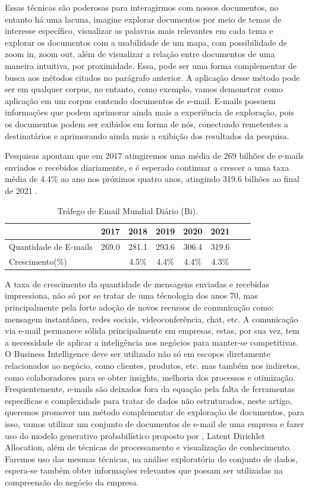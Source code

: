 \documentclass[12pt,a4paper]{article}
\begin{document}
  Essas técnicas são poderosas para interagirmos com nossos documentos, no entanto há uma lacuna, imagine explorar documentos por meio de temas de interesse específico, visualizar as palavras mais relevantes em cada tema e explorar os documentos com a usabilidade de um mapa, com possibilidade de zoom in, zoom out, além de visualizar a relação entre documentos de uma maneira intuitiva, por proximidade. Essa, pode ser uma forma complementar de busca aos métodos citados no parágrafo anterior. A aplicação desse método pode ser em qualquer corpus, no entanto, como exemplo, vamos demonstrar como aplicação em um corpus contendo documentos de e-mail.
  E-mails possuem informações que podem aprimorar ainda mais a experiência de exploração, pois os documentos podem ser exibidos em forma de nós, conectando remetentes a destinatários e aprimorando ainda mais a exibição dos resultados da pesquisa.
  
  Pesquisas apontam que em 2017 atingiremos uma média de 269 bilhões de e-mails enviados e recebidos diariamente, e é esperado continuar a crescer a uma taxa média de 4.4\% ao ano nos próximos quatro anos, atingindo 319.6 bilhões ao final de 2021 \cite{radicati2017}.
  
  \begin{table}[h]
    \centering
    \begin{tabular}{l*{6}{c}r}
    &					2017 &	2018 &	2019 &	2020 &	2021 & \\
    \hline
    Quantidade de E-mails &			269.0 &	281.1 &	293.6 &	306.4 &	319.6 & \\
    Crescimento(\%) &  	&		4.5\% &	4.4\% &	4.4\% &	4.3\% & \\
    \hline
    \end{tabular}
    \caption{Tráfego de Email Mundial Diário  (Bi). \cite{radicati2017}}
  \end{table}
  
  A taxa de crescimento da quantidade de mensagens enviadas e recebidas impressiona, não só por se tratar de uma técnologia dos anos 70, mas principalmente pela forte adoção de novos recursos de comunicação como: mensagem instantânea, redes sociais, videoconferência, chat, etc. A comunicação via e-mail permanece sólida principalmente em empresas, estas, por sua vez, tem a necessidade de aplicar a inteligência nos negócios para manter-se competitivas. O Business Intelligence deve ser utilizado não só em escopos diretamente relacionados ao negócio, como clientes, produtos, etc. mas também nos indiretos, como colaboradores para se obter insights, melhoria dos processos e otimização. Frequentemente, e-mails são deixados fora da equação pela falta de ferramentas específicas e complexidade para tratar de dados não estruturados, neste artigo, queremos promover um método complementar de exploração de documentos, para isso, vamos utilizar um conjunto de documentos de e-mail de uma empresa e fazer uso do modelo generativo probabilístico proposto por , Latent Dirichlet Allocation, além de técnicas de processamento e visualização de conhecimento. Faremos uso das mesmas técnicas, na análise exploratória do conjunto de dados, espera-se também obter informações relevantes que possam ser utilizadas na compreensão do negócio da empresa.
  
\end{document}
